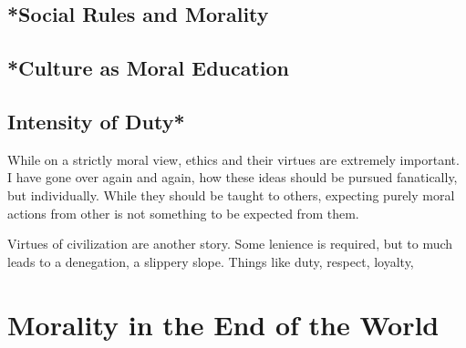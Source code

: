 \subsection{*Social Rules and Morality}
\subsection{*Culture as Moral Education}
\subsection{Intensity of Duty*}
\par While on a strictly moral view, ethics and their virtues are extremely important. I have gone over again and again, how these ideas should be pursued fanatically, but individually. While they should be taught to others, expecting purely moral actions from other is not something to be expected from them.
\par Virtues of civilization are another story. Some lenience is required, but to much leads to a denegation, a slippery slope. Things like duty, respect, loyalty,

\section{Morality in the End of the World}
